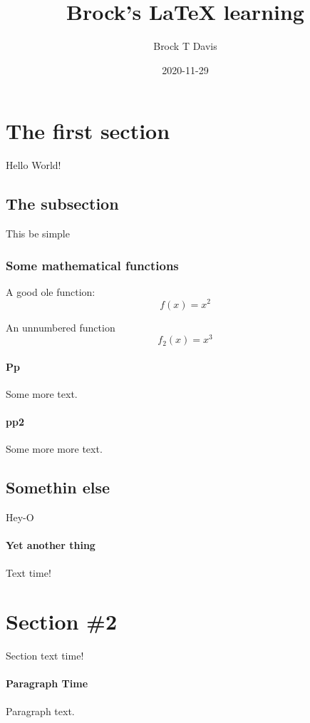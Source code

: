 \documentclass{article}
\title{Brock's LaTeX learning}
\date{2020-11-29}
\author{Brock T Davis}
\begin{document}
  \maketitle
  \newpage


  \section{The first section}
    Hello World!

  \subsection{The subsection}
    This be simple

  \subsubsection{Some mathematical functions}
    A good ole function:
    \begin{equation}
      f(x) = x^2
    \end{equation}

    An unnumbered function
    \begin{equation*}
      f_2(x) = x^3
    \end{equation*}


  \paragraph{Pp}
    Some more text.

  \paragraph{pp2}
    Some more more text.

  \subsection{Somethin else}
    Hey-O

  \paragraph{Yet another thing}
    Text time!

  \section{Section \#2}
    Section text time!

  \paragraph{Paragraph Time}
    Paragraph text.
\end{document}
